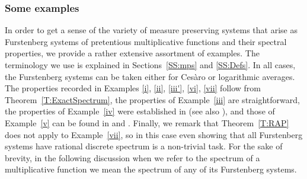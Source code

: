 \documentclass[11pt]{amsart}
\theoremstyle{definition}
\begin{document}
	\subsubsection{Some examples} \label{SSS:Examples}
In order to get a sense of the variety of  measure preserving systems that arise as Furstenberg systems of pretentious multiplicative functions and their spectral properties, we provide a rather extensive assortment of  examples.
The terminology we use is explained in Sections~\ref{SS:mps} and \ref{SS:Defs}.  In all cases, the Furstenberg systems can be taken either  for  Ces\`aro or logarithmic averages.
The properties
recorded in Examples  \eqref{i}, \eqref{ii}, \eqref{iii'}, \eqref{vi}, \eqref{vii} follow from Theorem~\ref{T:ExactSpectrum}, the properties of Example~\eqref{iii} are straightforward,   the properties of Example~\eqref{iv} were established  in  \cite{CS13} (see also \cite[Theorem~9]{S}), and
those  of Example~\eqref{v} can be found in \cite[Corollary~5.5]{GLR21} and  \cite[Section~1.3]{FH21}.
Finally, we remark that Theorem~\ref{T:RAP} does not apply to  Example~\eqref{vii}, so in this case even showing that all Furstenberg systems have rational discrete spectrum is a non-trivial task. For the sake of brevity, in the following discussion when we refer to the spectrum of a multiplicative function we mean the spectrum of any of its Furstenberg systems.
\end{document}
